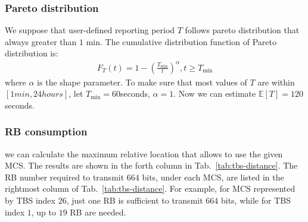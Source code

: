 \subsubsection{Pareto distribution}
We suppose that user-defined reporting period $T$ follows pareto distribution that always greater than $1$ min. The cumulative distribution function of Pareto distribution is:
\begin{align}
	F_T(t) = 1 - (\frac{T_{\text{min}}}{t})^{\alpha}, t \geq T_{\text{min}} 
\end{align}
where $\alpha$ is the shape parameter. To make sure that most values of $T$ are within $\left[1 min, 24 hours \right] $, let $T_{\text{min}}  = 60 $seconds, $\alpha = 1$. Now we can estimate $\mathbb{E}[T] = 120$ seconds. 

\subsubsection{RB consumption}
we can calculate the maximum relative location that allows to use the given MCS. The results are shown in the forth column in Tab.~\ref{tab:tbs-distance}. The RB number required to transmit $664$ bits, under each MCS, are listed in the rightmost column of Tab.~\ref{tab:tbs-distance}. For example, for MCS represented by TBS index $26$, just one RB is sufficient to transmit $664$ bits, while for TBS index $1$, up to $19$ RB are needed.


